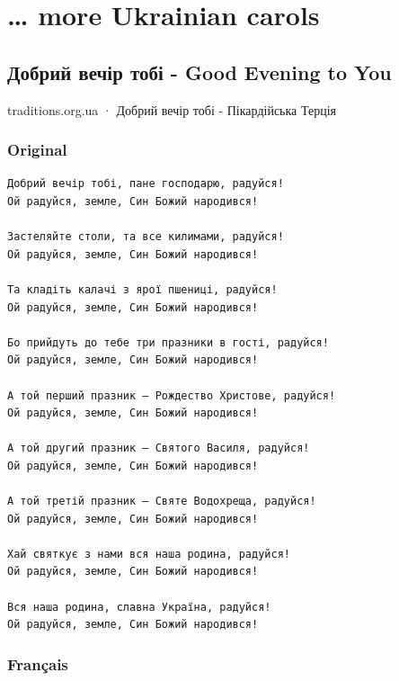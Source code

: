 \documentclass[
]{article}
\begin{document}
\hypertarget{more-ukrainian-carols}{%
\section{\ldots{} more Ukrainian carols}\label{more-ukrainian-carols}}

\hypertarget{ux434ux43eux431ux440ux438ux439-ux432ux435ux447ux456ux440-ux442ux43eux431ux456---good-evening-to-you}{%
\subsection*{Добрий вечір тобі - Good Evening to
You}\label{ux434ux43eux431ux440ux438ux439-ux432ux435ux447ux456ux440-ux442ux43eux431ux456---good-evening-to-you}}

traditions.org.ua · Добрий вечір тобі - Пікардійська Терція

\hypertarget{original-4}{%
\subsubsection*{Original}\label{original-4}}

\begin{verbatim}
Добрий вечір тобі, пане господарю, радуйся!
Ой радуйся, земле, Син Божий народився!

Застеляйте столи, та все килимами, радуйся!
Ой радуйся, земле, Син Божий народився!

Та кладіть калачі з ярої пшениці, радуйся!
Ой радуйся, земле, Син Божий народився!

Бо прийдуть до тебе три празники в гості, радуйся!
Ой радуйся, земле, Син Божий народився!

А той перший празник – Рождество Христове, радуйся!
Ой радуйся, земле, Син Божий народився!

А той другий празник – Святого Василя, радуйся!
Ой радуйся, земле, Син Божий народився!

А той третій празник – Святе Водохреща, радуйся!
Ой радуйся, земле, Син Божий народився!

Хай святкує з нами вся наша родина, радуйся!
Ой радуйся, земле, Син Божий народився!

Вся наша родина, славна Україна, радуйся!
Ой радуйся, земле, Син Божий народився!
\end{verbatim}

\hypertarget{franuxe7ais-2}{%
\subsubsection*{Français}\label{franuxe7ais-2}}
\end{document}
